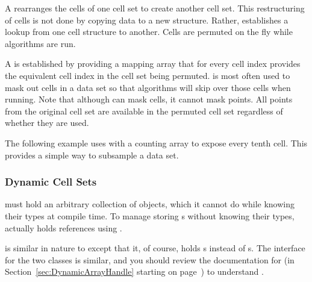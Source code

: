 
A  rearranges the cells of one cell set to
create another cell set. This restructuring of cells is not done by copying
data to a new structure. Rather, 
establishes a lookup from one cell structure to another. Cells are permuted
on the fly while algorithms are run.

A  is established by providing a mapping
array that for every cell index provides the equivalent cell index in the
cell set being permuted.  is most often
used to mask out cells in a data set so that algorithms will skip over
those cells when running. Note that although
 can mask cells, it cannot mask points.
All points from the original cell set are available in the permuted cell
set regardless of whether they are used.

The following example uses  with a counting
array to expose every tenth cell. This provides a simple way to subsample a
data set.



\subsubsection{Dynamic Cell Sets}


 must hold an arbitrary collection of 
objects, which it cannot do while knowing their types at compile time. To
manage storing s without knowing their types,
 actually holds references using
.

 is similar in nature to
 except that it, of course, holds
s instead of s. The
interface for the two classes is similar, and you should review the
documentation for  (in
Section~\ref{sec:DynamicArrayHandle} starting on
page~\pageref{sec:DynamicArrayHandle}) to understand
.


